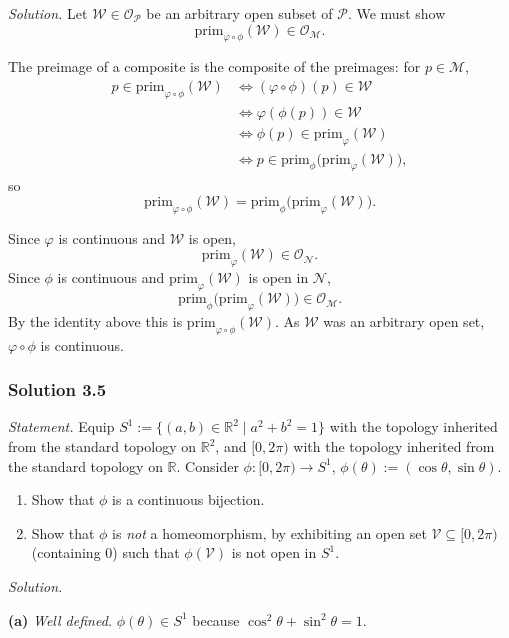 \documentclass[11pt]{article}
\newcommand{\prim}[1]{\mathrm{prim}_{#1}}
\begin{document}
\medskip
\noindent\textit{Solution.} Let $\mathcal W\in\mathcal O_{\mathcal P}$ be an arbitrary open subset of $\mathcal P$. We must show
\[
\prim{\varphi\circ\phi}(\mathcal W)\in\mathcal O_{\mathcal M}.
\]

The preimage of a composite is the composite of the preimages: for $p\in\mathcal M$,
\begin{align*}
p\in\prim{\varphi\circ\phi}(\mathcal W)
&\iff (\varphi\circ\phi)(p)\in\mathcal W\\
&\iff \varphi(\phi(p))\in\mathcal W\\
&\iff \phi(p)\in\prim{\varphi}(\mathcal W)\\
&\iff p\in\prim{\phi}\big(\prim{\varphi}(\mathcal W)\big),
\end{align*}
so
\[
\prim{\varphi\circ\phi}(\mathcal W)=\prim{\phi}\big(\prim{\varphi}(\mathcal W)\big).
\]

Since $\varphi$ is continuous and $\mathcal W$ is open,
\[
\prim{\varphi}(\mathcal W)\in\mathcal O_{\mathcal N}.
\]
Since $\phi$ is continuous and $\prim{\varphi}(\mathcal W)$ is open in $\mathcal N$,
\[
\prim{\phi}\big(\prim{\varphi}(\mathcal W)\big)\in\mathcal O_{\mathcal M}.
\]
By the identity above this is $\prim{\varphi\circ\phi}(\mathcal W)$. As $\mathcal W$ was an arbitrary open set, $\varphi\circ\phi$ is continuous.

\subsubsection*{Solution 3.5}

\noindent\textit{Statement.} Equip $S^1:=\{(a,b)\in\mathbb R^2\mid a^2+b^2=1\}$ with the topology inherited from the standard topology on $\mathbb R^2$, and $[0,2\pi)$ with the topology inherited from the standard topology on $\mathbb R$. Consider $\phi:[0,2\pi)\to S^1$, $\phi(\theta):=(\cos\theta,\sin\theta)$.
\begin{enumerate}[label=(\alph*)]
  \item Show that $\phi$ is a continuous bijection.
  \item Show that $\phi$ is \emph{not} a homeomorphism, by exhibiting an open set $\mathcal V\subseteq[0,2\pi)$ (containing $0$) such that $\phi(\mathcal V)$ is not open in $S^1$.
\end{enumerate}

\medskip
\noindent\textit{Solution.}

\textbf{(a)} \emph{Well defined.} $\phi(\theta)\in S^1$ because $\cos^2\theta+\sin^2\theta=1$.
\end{document}
